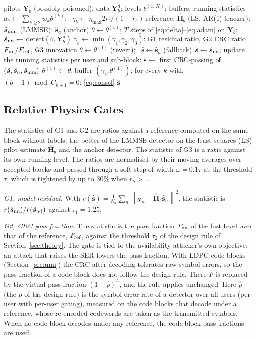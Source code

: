 \documentclass[journal]{IEEEtran}
\theoremstyle{remark}
\newcommand{\norm}[1]{\left\lVert #1 \right\rVert}
\begin{document}
\begin{algorithm}[t]
\caption{Citadel-Rx, one block $b$}\label{alg:block}
\scriptsize
\begin{algorithmic}[1]
\Require pilots $\bm Y_b$ (possibly poisoned), data $\bm Y^{d}_b$; levels $\theta^{(1..K)}$; buffers; running statistics
\State $a_b\gets\sum_{k\ge2}w_k\theta^{(k)}$; \ $\eta_b\gets\eta_{\max}2r_b/(1+r_b)$
\State reference: $\hat{\bm H}_b$ (LS, AR(1) tracker); $\hat{\bm s}_{\rm mm}$ (LMMSE); $\hat{\bm s}_{a}$ (anchor)
\State $\theta\gets\theta^{(1)}$; $T$ steps of \eqref{eq:delta}--\eqref{eq:adam} on $\bm Y_b$; $\hat{\bm s}_{\rm nn}\gets$ detect$(\theta,\bm Y^d_b)$
\State $\gamma_b\gets\min(\gamma_1,\gamma_2,\gamma_3)$: G1 residual ratio, G2 CRC ratio $F_{\rm nn}/F_{\rm ref}$, G3 innovation
\State $\theta\gets\theta^{(1)}$ (revert); \ $\hat{\bm s}\gets\hat{\bm s}_{a}$ (fallback)
\Else
\State $\hat{\bm s}\gets\hat{\bm s}_{\rm nn}$; update the running statistics
\EndIf
\State per user and sub-block: $\hat{\bm s}\gets$ first CRC-passing of $(\hat{\bm s},\hat{\bm s}_a,\hat{\bm s}_{\rm mm})$
\State $\theta^{(1)}\gets\theta$; buffer $(\gamma_b,\theta^{(1)})$; for every $k$ with $(b+1)\bmod C_{k+1}=0$: \eqref{eq:consol}
\State \Return $\hat{\bm s}$
\end{algorithmic}
\end{algorithm}

\subsection{Relative Physics Gates}\label{sec:gates}
The statistics of G1 and G2 are ratios against a reference computed on the same block without labels: the better of the LMMSE detector on the least-squares (LS) pilot estimate $\hat{\bm H}_b$ and the anchor detector. The statistic of G3 is a ratio against its own running level. The ratios are normalised by their moving averages over accepted blocks and passed through a soft step of width $\omega=0.1\tau$ at the threshold $\tau$, which is tightened by up to $30\%$ when $r_b>1$.

\textit{G1, model residual.} With $r(\hat{\bm s})=\tfrac1{N_d}\sum_n\norm{\bm y_n-\hat{\bm
H}_b\hat{\bm s}_n}^2$, the statistic is $r(\hat{\bm s}_{\rm nn})/r(\hat{\bm s}_{\rm ref})$ against
$\tau_1=1.25$.

\textit{G2, CRC pass fraction.} The statistic is the pass fraction $F_{\rm nn}$ of the fast level over that of the reference, $F_{\rm ref}$, against the threshold $\tau_2$ of the design rule of Section~\ref{sec:theory}. The gate is tied to the availability attacker's own objective: an attack that raises the SER lowers the pass fraction. With LDPC code blocks
(Section~\ref{sec:umi}) the CRC after decoding tolerates raw symbol errors, so the pass fraction of
a code block does not follow the design rule. There $F$ is replaced by the virtual pass fraction $(1-\hat p)^L$, and the rule applies unchanged. Here $\hat p$ (the $p$ of the design rule) is the symbol error rate of a detector over all users (per user with per-user gating), measured on the code blocks that decode under a reference, whose re-encoded codewords are taken as the transmitted symbols. When no code block decodes under any reference, the code-block pass fractions are used.
\end{document}
